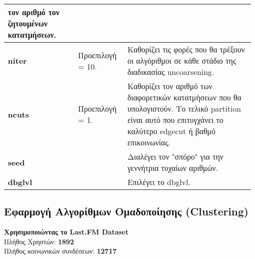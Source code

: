 \begin{tabular}{ | p{1.7cm} | p{5.5cm} | p{12.0cm} |}
    τον αριθμό τον ζητουμένων κατατμήσεων. \\ \hline
    \textbf{niter} & Προεπιλογή = 10. & Καθορίζει τις φορές που θα τρέξουν οι αλγόριθμοι σε
    κάθε στάδιο της διαδικασίας uncoarsening. \\ \hline  
    \textbf{ncuts} & Προεπιλογή = 1. &  Καθορίζει τον αριθμό των διαφορετικών κατατμήσεων 
    που θα υπολογιστούν. Το τελικό partition είναι αυτό που επιτυγχάνει το καλύτερο edgecut ή
    βαθμό επικοινωνίας.  \\ \hline
    \textbf{seed} &    & Διαλέγει τον "σπόρο" για την γεννήτρια τυχαίων αριθμών. \\ \hline
    \textbf{dbglvl} &    & Επιλέγει το dbglvl. \\ \hline
    \end{tabular}

\clearpage


\subsection{Εφαρμογή Αλγορίθμων Ομαδοποίησης (Clustering)} 

\begin{center}
\noindent
\textbf{Χρησιμοποιώντας το Last.FM Dataset}\\
Πλήθος Χρηστών: \textbf{1892}  \hfill \\
Πλήθος κοινωνικών συνδέσεων:  \textbf{12717}  \hfill \\
\end{center}

\vspace{0.5cm}


